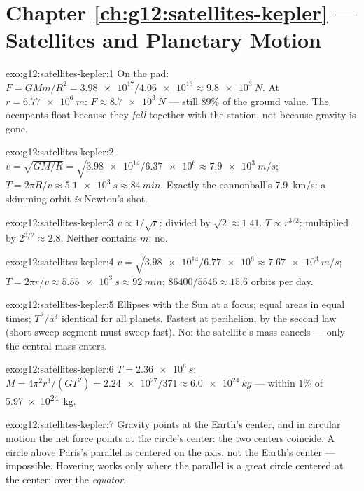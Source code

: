 \section*{Chapter \ref{ch:g12:satellites-kepler} --- Satellites and Planetary Motion}

\begin{solution}{exo:g12:satellites-kepler:1}
On the pad: $F = GMm/R^2 = \num{3.98e17}/\num{4.06e13} \approx
\qty{9.8e3}{N}$. At $r = \qty{6.77e6}{m}$:
$F \approx \qty{8.7e3}{N}$ --- still $89\%$ of the ground value. The
occupants float because they \emph{fall} together with the station,
not because gravity is gone.
\end{solution}

\begin{solution}{exo:g12:satellites-kepler:2}
$v = \sqrt{GM/R} = \sqrt{\num{3.98e14}/\num{6.37e6}} \approx
\qty{7.9e3}{m/s}$; $T = 2\pi R/v \approx \qty{5.1e3}{s} \approx
\qty{84}{min}$. Exactly the cannonball's \qty{7.9}{km/s}: a skimming
orbit \emph{is} Newton's shot.
\end{solution}

\begin{solution}{exo:g12:satellites-kepler:3}
$v \propto 1/\sqrt{r}$: divided by $\sqrt 2 \approx 1.41$.
$T \propto r^{3/2}$: multiplied by $2^{3/2} \approx 2.8$. Neither
contains $m$: no.
\end{solution}

\begin{solution}{exo:g12:satellites-kepler:4}
$v = \sqrt{\num{3.98e14}/\num{6.77e6}} \approx \qty{7.67e3}{m/s}$;
$T = 2\pi r/v \approx \qty{5.55e3}{s} \approx \qty{92}{min}$;
$\num{86400}/5546 \approx 15.6$ orbits per day.
\end{solution}

\begin{solution}{exo:g12:satellites-kepler:5}
Ellipses with the Sun at a focus; equal areas in equal times;
$T^2/a^3$ identical for all planets. Fastest at perihelion, by the
second law (short sweep segment must sweep fast). No: the satellite's
mass cancels --- only the central mass enters.
\end{solution}

\begin{solution}{exo:g12:satellites-kepler:6}
$T = \qty{2.36e6}{s}$: $M = 4\pi^2 r^3/(GT^2) =
\num{2.24e27}/371 \approx \qty{6.0e24}{kg}$ --- within $1\%$ of
\qty{5.97e24}{kg}.
\end{solution}

\begin{solution}{exo:g12:satellites-kepler:7}
Gravity points at the Earth's center, and in circular motion the net
force points at the circle's center: the two centers coincide. A
circle above Paris's parallel is centered on the axis, not the
Earth's center --- impossible. Hovering works only where the parallel
is a great circle centered at the center: over the \emph{equator}.
\end{solution}

